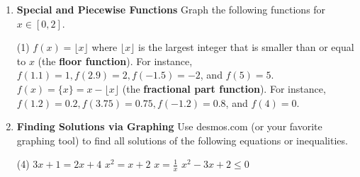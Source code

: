 \begin{enumerate}
\item \textbf{Special and Piecewise Functions} Graph the following functions for $x \in [0,2]$.
\begin{tasks}[after-skip = 75pt, after-item-skip = 75pt](1)
\task $f(x) = \lfloor x \rfloor$ where $\lfloor x \rfloor$ is the largest integer that is smaller than or equal to $x$ (the \textbf{floor function}). For instance, $f(1.1) = 1, f(2.9) = 2, f(-1.5)=-2$, and $f(5)=5$.
\task $f(x) = \{x\} = x - \lfloor x \rfloor$ (the \textbf{fractional part function}). For instance, $f(1.2) = 0.2, f(3.75) = 0.75, f(-1.2) = 0.8$, and $f(4) = 0$.
\end{tasks}

\item \textbf{Finding Solutions via Graphing} Use desmos.com (or your favorite graphing tool) to find all solutions of the following equations or inequalities.
\begin{tasks}[after-skip = 40pt](4)
\task $3x+1 = 2x+4$
\task $x^2 = x+2$
\task $x = \frac{1}{x}$
\task $x^2-3x+2 \leq 0$
\end{tasks}

\end{enumerate}